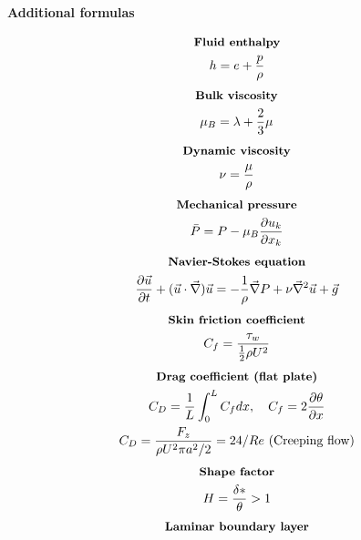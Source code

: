 \documentclass[10pt, a4paper]{article}
\newcommand{\derivative}[2]{\frac{\partial #1}{\partial #2}}
\begin{document}
\begin{center}
    \Large
    \textbf{Additional formulas}
    \vspace{0.5cm}
\end{center}
\begin{multicols*}{2}
    \begin{gather*}
        \textbf{\small Fluid enthalpy} \\
        h = e + \frac{p}{\rho}
    \end{gather*}
    \begin{gather*}
        \textbf{\small Bulk viscosity} \\
        \mu_B = \lambda + \frac23 \mu
    \end{gather*}
    \begin{gather*}
        \textbf{\small Dynamic viscosity} \\
        \nu = \frac{\mu}{\rho}
    \end{gather*}
    \begin{gather*}
        \textbf{\small Mechanical pressure} \\
        \bar{P} = P - \mu_B\derivative{u_k}{x_k}
    \end{gather*}
    \begin{gather*}
        \textbf{\small Navier-Stokes equation} \\
        \derivative{ \vec{u}}{t} + (\vec{u}\cdot \vec{\nabla})\vec{u} =
        -\frac{1}{\rho}\vec{\nabla}P + \nu \vec{\nabla}^2 \vec{u} + \vec{g}
    \end{gather*}
    \begin{gather*}
        \textbf{\small Skin friction coefficient} \\
        C_f = \frac{\tau_w}{\frac12 \rho U^2}
    \end{gather*}
    \begin{gather*}
        \textbf{\small Drag coefficient (flat plate)} \\
        C_D = \frac{1}{L}\int_0^L C_f dx, \quad C_f = 2\derivative{ \theta}{x} \\
        C_D = \frac{F_z}{\rho U^2\pi a^2 /2} = 24/Re \text{ (Creeping flow)}
    \end{gather*}
    \begin{gather*}
        \textbf{\small Shape factor} \\
        H = \frac{\delta *}{\theta} > 1
    \end{gather*}
    \begin{gather*}
        \textbf{\small Laminar boundary layer} \\

\end{gather*}
\end{multicols*}
\end{document}
